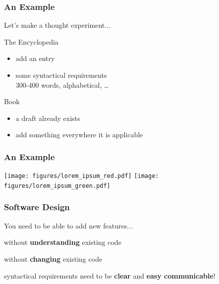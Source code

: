 \documentclass{beamer}
\newenvironment{wideitemize}{
    \itemize\addtolength{\itemsep}{15pt}\addtolength{\topsep}{10pt}}{\enditemize}
\begin{document}
    \begin{frame}
        \frametitle{An Example}
        Let's make a thought experiment...
        \vspace{0.8cm}
        \begin{wideitemize}
            \item The Encyclopedia
            \begin{itemize}
                \item add an entry
                \item some syntactical requirements\\
                {\small 300-400 words, alphabetical, \ldots}
            \end{itemize}
            \item Book
            \begin{itemize}
                \item a draft already exists
                \item add something everywhere it is applicable
            \end{itemize}
        \end{wideitemize}
    \end{frame}

    \begin{frame}
        \frametitle{An Example}\vspace{0.5cm}
        \texttt{[image: figures/lorem\_ipsum\_red.pdf]}%
        \texttt{[image: figures/lorem\_ipsum\_green.pdf]}
    \end{frame}

    \begin{frame}
        \frametitle{Software Design}
        \pause
        You need to be able to add new features...
        \vspace{0.8cm}
        \begin{wideitemize}
            \item without \textbf{understanding} existing code
            \item without \textbf{changing} existing code
            \item syntactical requirements need to be \textbf{clear} and \textbf{easy communicable}!
        \end{wideitemize}
    \end{frame}
\end{document}

